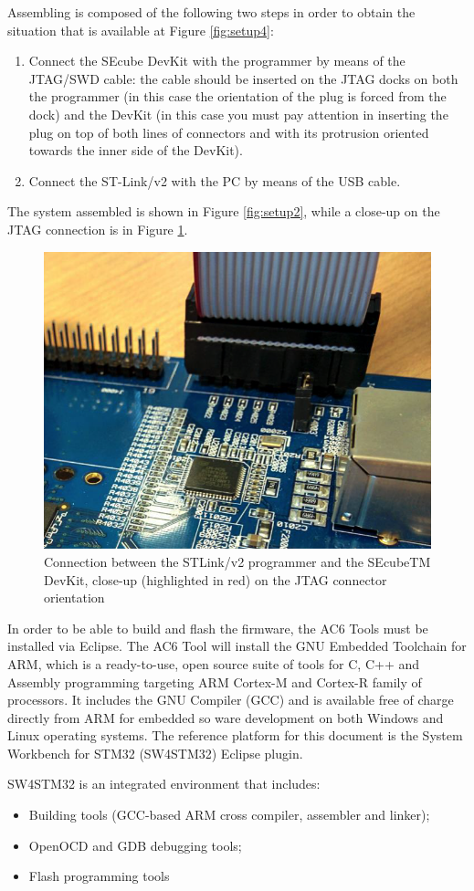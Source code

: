 Assembling is composed of the following two steps in order to obtain the situation that is available at Figure \ref{fig:setup4}:
\begin{enumerate}
	\item Connect the SEcube DevKit with the programmer by means of the JTAG/SWD cable: the
	cable should be inserted on the JTAG docks on both the programmer (in this case the orientation of the plug is forced from the dock) and the DevKit (in this case you must pay
	attention in inserting the plug on top of both lines of connectors and with its protrusion
	oriented towards the inner side of the DevKit).
	\item Connect the ST-Link/v2 with the PC by means of the USB cable.
\end{enumerate}
The system assembled is shown in Figure \ref{fig:setup2}, while a close-up on the JTAG connection is in Figure \ref{fig:setup3}.

\begin{figure}
	\centering
	\includegraphics[width=0.35\linewidth]{images/firmware/setup_3}
	\caption{Connection between the STLink/v2 programmer and the SEcubeTM DevKit, close-up (highlighted in red) on the JTAG connector orientation}
	\label{fig:setup3}
\end{figure}


In order to be able to build and flash the firmware, the AC6 Tools must be installed via Eclipse. The AC6 Tool will install the GNU Embedded Toolchain for ARM, which is a ready-to-use, open
source suite of tools for C, C++ and Assembly programming targeting ARM Cortex-M and Cortex-R
family of processors. It includes the GNU Compiler (GCC) and is available free of charge directly
from ARM for embedded so ware development on both Windows and Linux operating systems.
The reference platform for this document is the System Workbench for STM32 (SW4STM32) Eclipse
plugin.

SW4STM32 is an integrated environment that includes:
\begin{itemize}
	\item Building tools (GCC-based ARM cross compiler, assembler and linker);
	\item OpenOCD and GDB debugging tools;
	\item Flash programming tools
\end{itemize}


